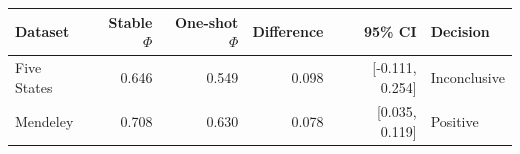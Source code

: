 \begin{tabular}{lrrrrl}
\toprule
Dataset & Stable $\Phi$ & One-shot $\Phi$ & Difference & 95\% CI & Decision \\
\midrule
Five States & 0.646 & 0.549 & 0.098 & [-0.111, 0.254] & Inconclusive \\
Mendeley & 0.708 & 0.630 & 0.078 & [0.035, 0.119] & Positive \\
\bottomrule
\end{tabular}
